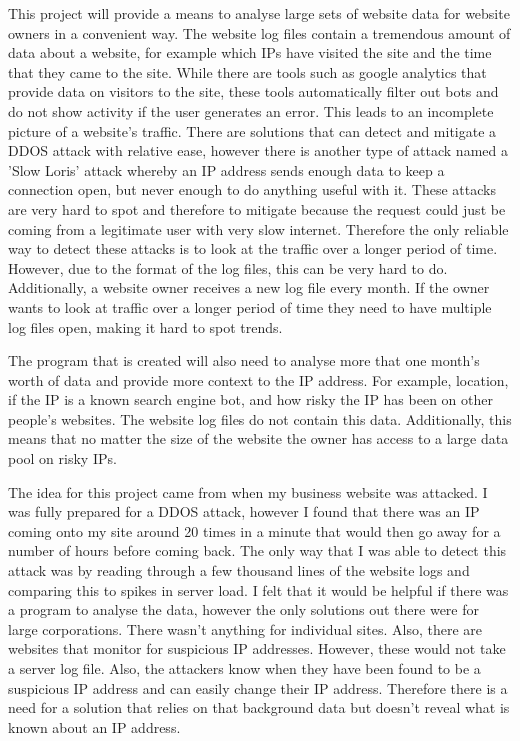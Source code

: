 This project will provide a means to analyse large sets of website data for website owners in a convenient way. The website log files contain a tremendous amount of data about a website, for example which IPs have visited the site and the time that they came to the site. While there are tools such as google analytics that provide data on visitors to the site, these tools automatically filter out bots and do not show activity if the user generates an error. This leads to an incomplete picture of a website's traffic. There are solutions that can detect and mitigate a DDOS attack with relative ease, however there is another type of attack named a 'Slow Loris' attack whereby an IP address sends enough data to keep a connection open, but never enough to do anything useful with it. These attacks are very hard to spot and therefore to mitigate because the request could just be coming from a legitimate user with very slow internet. Therefore the only reliable way to detect these attacks is to look at the traffic over a longer period of time. However, due to the format of the log files, this can be very hard to do. Additionally, a website owner receives a new log file every month. If the owner wants to look at traffic over a longer period of time they need to have multiple log files open, making it hard to spot trends.

The program that is created will also need to analyse more that one month's worth of data and provide more context to the IP address. For example, location, if the IP is a known search engine bot, and how risky the IP has been on other people's websites. The website log files do not contain this data. Additionally, this means that no matter the size of the website the owner has access to a large data pool on risky IPs. 

The idea for this project came from when my business website was attacked. I was fully prepared for a DDOS attack, however I found that there was an IP coming onto my site around 20 times in a minute that would then go away for a number of hours before coming back. The only way that I was able to detect this attack was by reading through a few thousand lines of the website logs and comparing this to spikes in server load. I felt that it would be helpful if there was a program to analyse the data, however the only solutions out there were for large corporations. There wasn't anything for individual sites. Also, there are websites that monitor for suspicious IP addresses. However, these would not take a server log file. Also, the attackers know when they have been found to be a suspicious IP address and can easily change their IP address. Therefore there is a need for a solution that relies on that background data but doesn't reveal what is known about an IP address.

